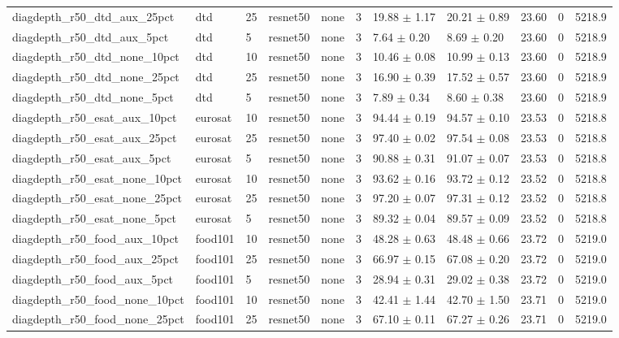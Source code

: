 \begin{tabular}{lllllllllll}
diagdepth_r50_dtd_aux_25pct & dtd & 25 & resnet50 & none & 3 & 19.88 $\pm$ 1.17 & 20.21 $\pm$ 0.89 & 23.60 & 0 & 5218.9 \\
diagdepth_r50_dtd_aux_5pct & dtd & 5 & resnet50 & none & 3 & 7.64 $\pm$ 0.20 & 8.69 $\pm$ 0.20 & 23.60 & 0 & 5218.9 \\
diagdepth_r50_dtd_none_10pct & dtd & 10 & resnet50 & none & 3 & 10.46 $\pm$ 0.08 & 10.99 $\pm$ 0.13 & 23.60 & 0 & 5218.9 \\
diagdepth_r50_dtd_none_25pct & dtd & 25 & resnet50 & none & 3 & 16.90 $\pm$ 0.39 & 17.52 $\pm$ 0.57 & 23.60 & 0 & 5218.9 \\
diagdepth_r50_dtd_none_5pct & dtd & 5 & resnet50 & none & 3 & 7.89 $\pm$ 0.34 & 8.60 $\pm$ 0.38 & 23.60 & 0 & 5218.9 \\
diagdepth_r50_esat_aux_10pct & eurosat & 10 & resnet50 & none & 3 & 94.44 $\pm$ 0.19 & 94.57 $\pm$ 0.10 & 23.53 & 0 & 5218.8 \\
diagdepth_r50_esat_aux_25pct & eurosat & 25 & resnet50 & none & 3 & 97.40 $\pm$ 0.02 & 97.54 $\pm$ 0.08 & 23.53 & 0 & 5218.8 \\
diagdepth_r50_esat_aux_5pct & eurosat & 5 & resnet50 & none & 3 & 90.88 $\pm$ 0.31 & 91.07 $\pm$ 0.07 & 23.53 & 0 & 5218.8 \\
diagdepth_r50_esat_none_10pct & eurosat & 10 & resnet50 & none & 3 & 93.62 $\pm$ 0.16 & 93.72 $\pm$ 0.12 & 23.52 & 0 & 5218.8 \\
diagdepth_r50_esat_none_25pct & eurosat & 25 & resnet50 & none & 3 & 97.20 $\pm$ 0.07 & 97.31 $\pm$ 0.12 & 23.52 & 0 & 5218.8 \\
diagdepth_r50_esat_none_5pct & eurosat & 5 & resnet50 & none & 3 & 89.32 $\pm$ 0.04 & 89.57 $\pm$ 0.09 & 23.52 & 0 & 5218.8 \\
diagdepth_r50_food_aux_10pct & food101 & 10 & resnet50 & none & 3 & 48.28 $\pm$ 0.63 & 48.48 $\pm$ 0.66 & 23.72 & 0 & 5219.0 \\
diagdepth_r50_food_aux_25pct & food101 & 25 & resnet50 & none & 3 & 66.97 $\pm$ 0.15 & 67.08 $\pm$ 0.20 & 23.72 & 0 & 5219.0 \\
diagdepth_r50_food_aux_5pct & food101 & 5 & resnet50 & none & 3 & 28.94 $\pm$ 0.31 & 29.02 $\pm$ 0.38 & 23.72 & 0 & 5219.0 \\
diagdepth_r50_food_none_10pct & food101 & 10 & resnet50 & none & 3 & 42.41 $\pm$ 1.44 & 42.70 $\pm$ 1.50 & 23.71 & 0 & 5219.0 \\
diagdepth_r50_food_none_25pct & food101 & 25 & resnet50 & none & 3 & 67.10 $\pm$ 0.11 & 67.27 $\pm$ 0.26 & 23.71 & 0 & 5219.0 \\

\end{tabular}
